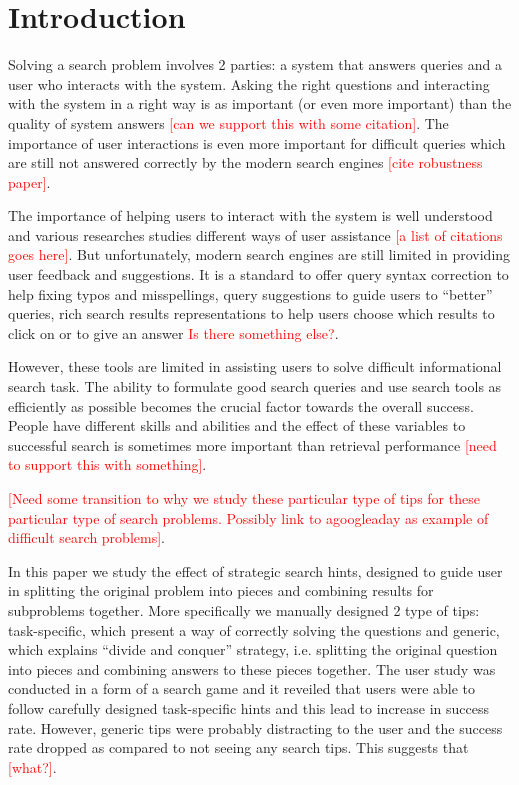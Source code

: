 \documentclass{sig-alternate}
\newcommand\todo[1]{\textcolor{red}{#1}}
\begin{document}

\section{Introduction}
Solving a search problem involves 2 parties: a system that answers queries and a user who interacts with the system. Asking the right questions and interacting with the system in a right way is as important (or even more important) than the quality of system answers \todo{[can we support this with some citation]}. The importance of user interactions is even more important for difficult queries which are still not answered correctly by the modern search engines \todo{[cite robustness paper]}. 

The importance of helping users to interact with the system is well understood and various researches studies different ways of user assistance \todo{[a list of citations goes here]}. But unfortunately, modern search engines are still limited in providing user feedback and suggestions. It is a standard to offer query syntax correction to help fixing typos and misspellings, query suggestions to guide users to ``better'' queries, rich search results representations to help users choose which results to click on or to give an answer \todo{Is there something else?}.

However, these tools are limited in assisting users to solve difficult informational search task. The ability to formulate good search queries and use search tools as efficiently as possible becomes the crucial factor towards the overall success. People have different skills and abilities and the effect of these variables to successful search is sometimes more important than retrieval performance \todo{[need to support this with something]}. 

\todo{[Need some transition to why we study these particular type of tips for these particular type of search problems. Possibly link to agoogleaday as example of difficult search problems]}. 

In this paper we study the effect of strategic search hints, designed to guide user in splitting the original problem into pieces and combining results for subproblems together. More specifically we manually designed 2 type of tips: task-specific, which present a way of correctly solving the questions and generic, which explains ``divide and conquer'' strategy, i.e. splitting the original question into pieces and combining answers to these pieces together. The user study was conducted in a form of a search game and it reveiled that users were able to follow carefully designed task-specific hints and this lead to increase in success rate. However, generic tips were probably distracting to the user and the success rate dropped as compared to not seeing any search tips.
This suggests that \todo{[what?]}.
\end{document}
